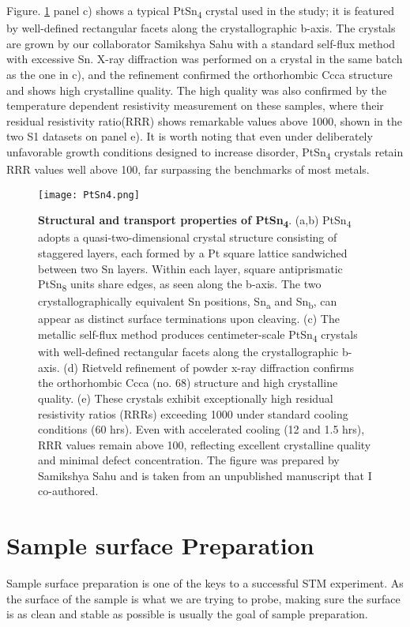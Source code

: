 Figure. \ref{fig:crystal_struc} panel c) shows a typical PtSn\textsubscript{4} crystal used in the study; it is featured by well-defined rectangular facets along the crystallographic b-axis. The crystals are grown by our collaborator Samikshya Sahu with a standard self-flux method with excessive Sn. X-ray diffraction was performed on a crystal in the same batch as the one in c), and the refinement confirmed the orthorhombic Ccca structure and shows high crystalline quality. The high quality was also confirmed by the temperature dependent resistivity measurement on these samples, where their residual resistivity ratio(RRR) shows remarkable values above 1000, shown in the two S1 datasets on panel e). It is worth noting that even under deliberately unfavorable growth conditions designed to increase disorder, PtSn\textsubscript{4} crystals retain RRR values well above 100, far surpassing the benchmarks of most metals.

\begin{figure}
	\centering
	\texttt{[image: PtSn4.png]}
	\caption[\textbf{Structural and transport properties of PtSn\textsubscript{4}}]{\textbf{Structural and transport properties of PtSn\textsubscript{4}}. (a,b) PtSn\textsubscript{4} adopts a quasi-two-dimensional crystal structure consisting of staggered layers, each formed by a Pt square lattice sandwiched between two Sn layers. Within each layer, square antiprismatic PtSn\textsubscript{8} units share edges, as seen along the b-axis. The two crystallographically equivalent Sn positions, Sn\textsubscript{a} and Sn\textsubscript{b}, can appear as distinct surface terminations upon cleaving. (c) The metallic self-flux method produces centimeter-scale PtSn\textsubscript{4} crystals with well-defined rectangular facets along the crystallographic b-axis. (d) Rietveld refinement of powder x-ray diffraction confirms the orthorhombic Ccca (no. 68) structure and high crystalline quality. (e) These crystals exhibit exceptionally high residual resistivity ratios (RRRs) exceeding 1000 under standard cooling conditions (60 hrs). Even with accelerated cooling (12 and 1.5 hrs), RRR values remain above 100, reflecting excellent crystalline quality and minimal defect concentration. The figure was prepared by Samikshya Sahu and is taken from an unpublished manuscript that I co-authored.}
	\label{fig:crystal_struc}
\end{figure}

\section{Sample surface Preparation}
\par Sample surface preparation is one of the keys to a successful STM experiment. As the surface of the sample is what we are trying to probe, making sure the surface is as clean and stable as possible is usually the goal of sample preparation. 

